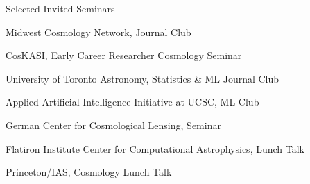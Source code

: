 \begin{cvlist_tight}{Selected Invited Seminars}
\item[2022] Midwest Cosmology Network, Journal Club
\item[2022] CosKASI, Early Career Researcher Cosmology Seminar
\item[2021] University of Toronto Astronomy, Statistics \& ML Journal Club 
\item[2021] Applied Artificial Intelligence Initiative at UCSC, ML Club
\item[2021] German Center for Cosmological Lensing, Seminar
\item[2020] Flatiron Institute Center for Computational Astrophysics, Lunch Talk
\item[2020] Princeton/IAS, Cosmology Lunch Talk
\end{cvlist_tight}